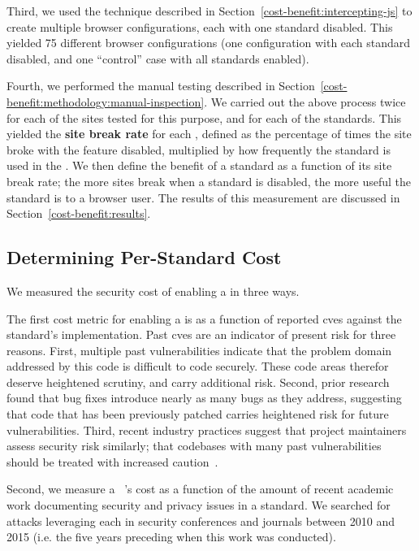 Third, we used the technique described in
Section~\ref{cost-benefit:intercepting-js} to create multiple browser
configurations, each with one standard disabled.  This yielded 75 different
browser configurations (one configuration with each standard disabled, and one
``control'' case with all standards enabled).

Fourth, we performed the manual testing described in
Section~\ref{cost-benefit:methodology:manual-inspection}.  We carried out the
above process twice for each of the \NumSitesTestedInStandardTests sites tested
for this purpose, and for each of the \NumStandards \WAPI standards.
This yielded the \textbf{site break rate} for each \WAS, defined as the
percentage of times the site broke with the feature disabled, multiplied by
how frequently the standard is used in the \ATK.  We then define the benefit of
a standard as a function of its site break rate; the more sites break when a
standard is disabled, the more useful the standard is to a browser user.  The
results of this measurement are discussed in
Section~\ref{cost-benefit:results}.


\subsection{Determining Per-Standard Cost}
\label{cost-benefit:methodology:per-standard-cost}
We measured the security cost of enabling a \WAS in three ways.

The first cost metric for enabling a \WAS is as a function of reported
\gls{cve}s against the standard's implementation.  Past \gls{cve}s are an
indicator of present risk for three reasons.  First, multiple past
vulnerabilities indicate that the problem domain addressed by this code is
difficult to code securely. These code areas therefor deserve heightened
scrutiny, and carry additional risk.  Second, prior
research~\cite{ozment2006milk,zimmermann2008predicting} found that bug fixes
introduce nearly as many bugs as they address, suggesting that code that has
been previously patched carries heightened risk for future
vulnerabilities.  Third, recent industry practices suggest that project
maintainers assess security risk similarly; that codebases with many past
vulnerabilities should be treated with increased caution~\cite{boringssl}.

Second, we measure a \WAS~'s cost as a function of the amount of recent academic
work documenting security and privacy issues in a standard.  We searched
for attacks leveraging each \WAS in security conferences and journals between
2010 and 2015 (i.e. the five years preceding when this work was conducted).

